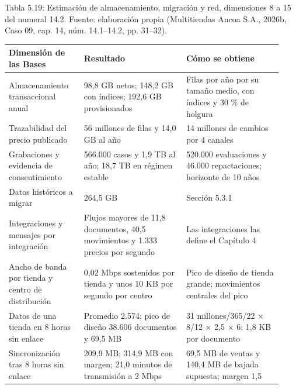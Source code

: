 \documentclass[11pt]{article}
\begin{document}
\par\vspace{0.6\baselineskip}\noindent\begin{minipage}{\linewidth}
Tabla 5.19: Estimación de almacenamiento, migración y red, dimensiones 8 a 15 del numeral 14.2. Fuente: elaboración propia (Multitiendas Ancoa S.A., 2026b, Caso 09, cap. 14, núm. 14.1–14.2, pp. 31–32).\label{tab:t24}\par\vspace{0.3\baselineskip}
\begin{tabular}{@{}p{0.255\linewidth}p{0.349\linewidth}p{0.322\linewidth}@{}}
\toprule Dimensión de las Bases & Resultado & Cómo se obtiene \\
\midrule
Almacenamiento transaccional anual & 98,8 GB netos; 148,2 GB con índices; 192,6 GB provisionados & Filas por año por su tamaño medio, con índices y 30 \% de holgura \\
Trazabilidad del precio publicado & 56 millones de filas y 14,0 GB al año & 14 millones de cambios por 4 canales \\
Grabaciones y evidencia de consentimiento & 566.000 casos y 1,9 TB al año; 18,7 TB en régimen estable & 520.000 evaluaciones y 46.000 repactaciones; horizonte de 10 años \\
Datos históricos a migrar & 264,5 GB & Sección 5.3.1 \\
Integraciones y mensajes por integración & Flujos mayores de 11,8 documentos, 40,5 movimientos y 1.333 precios por segundo & Las integraciones las define el Capítulo 4 \\
Ancho de banda por tienda y centro de distribución & 0,02 Mbps sostenidos por tienda y unos 10 KB por segundo por centro & Pico de diseño de tienda grande; movimientos centrales del pico \\
Datos de una tienda en 8 horas sin enlace & Promedio 2.574; pico de diseño 38.606 documentos y 69,5 MB & 31 millones/365/22 × 8/12 × 2,5 × 6; 1,8 KB por documento \\
Sincronización tras 8 horas sin enlace & 209,9 MB; 314,9 MB con margen; 21,0 minutos de transmisión a 2 Mbps & 69,5 MB de ventas y 140,4 MB de bajada supuesta; margen 1,5 \\
\bottomrule
\end{tabular}
\end{minipage}
\par
\end{document}
